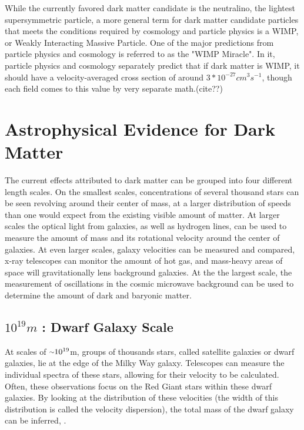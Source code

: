   While the currently favored dark matter candidate is the neutralino, the lightest supersymmetric particle, a more general term for dark matter candidate particles that meets the conditions required by cosmology and particle physics is a WIMP, or Weakly Interacting Massive Particle.
  One of the major predictions from particle physics and cosmology is referred to as the "WIMP Miracle".
  In it, particle physics and cosmology separately predict that if dark matter is WIMP, it should have a velocity-averaged cross section of around $3*10^{-27}cm^{3}s^{-1}$, though each field comes to this value by very separate math.(cite??)

\section{Astrophysical Evidence for Dark Matter}
  The current effects attributed to dark matter can be grouped into four different length scales.
  On the smallest scales, concentrations of several thousand stars can be seen revolving around their center of mass, at a larger distribution of speeds than one would expect from the existing visible amount of matter.
  At larger scales the optical light from galaxies, as well as hydrogen lines, can be used to measure the amount of mass and its rotational velocity around the center of galaxies.
  At even larger scales, galaxy velocities can be measured and compared, x-ray telescopes can monitor the amount of hot gas, and mass-heavy areas of space will gravitationally lens background galaxies.
  At the the largest scale, the measurement of oscillations in the cosmic microwave background can be used to determine the amount of dark and baryonic matter.
  
  \subsection{$10^{19}m$ : Dwarf Galaxy Scale}
    At scales of $\nicetilde 10^{19}$m, groups of thousands stars, called satellite galaxies or dwarf galaxies, lie at the edge of the Milky Way galaxy.
    Telescopes can measure the individual spectra of these stars, allowing for their velocity to be calculated.
    Often, these observations focus on the Red Giant stars within these dwarf galaxies\cite{dwarf_gal_red_giant}.
    By looking at the distribution of these velocities (the width of this distribution is called the velocity dispersion), the total mass of the dwarf galaxy can be inferred\cite{dwarf_gal_vel_dispersion}, \cite{dwarf_gal_vel_dispersion2}.

